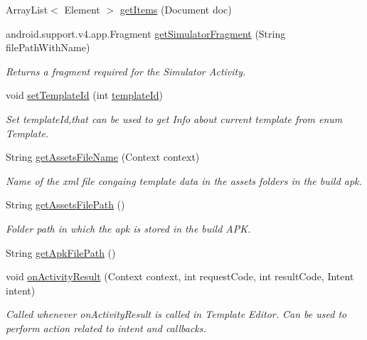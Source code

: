 \begin{DoxyCompactItemize}
Array\+List$<$ Element $>$ \hyperlink{classorg_1_1buildmlearn_1_1toolkit_1_1templates_1_1VideoCollectionTemplate_a1d33eff15dfaa7321a9ccc7d27c42000}{get\+Items} (Document doc)
\item 
android.\+support.\+v4.\+app.\+Fragment \hyperlink{classorg_1_1buildmlearn_1_1toolkit_1_1templates_1_1VideoCollectionTemplate_a5b2d1c99d0ed99bec0b3dc65764d352e}{get\+Simulator\+Fragment} (String file\+Path\+With\+Name)
\begin{DoxyCompactList}\small\item\em Returns a fragment required for the Simulator Activity. \end{DoxyCompactList}\item 
void \hyperlink{classorg_1_1buildmlearn_1_1toolkit_1_1templates_1_1VideoCollectionTemplate_a4ddf0868eaa350d857aad69a07d0b93b}{set\+Template\+Id} (int \hyperlink{classorg_1_1buildmlearn_1_1toolkit_1_1templates_1_1VideoCollectionTemplate_ac6e1ea89fd6a5a50f5a081fca1cf1531}{template\+Id})
\begin{DoxyCompactList}\small\item\em Set template\+Id,that can be used to get Info about current template from enum Template. \end{DoxyCompactList}\item 
String \hyperlink{classorg_1_1buildmlearn_1_1toolkit_1_1templates_1_1VideoCollectionTemplate_a058b86cba7b516627bc0785373d62cd4}{get\+Assets\+File\+Name} (Context context)
\begin{DoxyCompactList}\small\item\em Name of the xml file congaing template data in the assets folders in the build apk. \end{DoxyCompactList}\item 
String \hyperlink{classorg_1_1buildmlearn_1_1toolkit_1_1templates_1_1VideoCollectionTemplate_a74b3646b7e8a1b7db88a0d6598a1b7c6}{get\+Assets\+File\+Path} ()
\begin{DoxyCompactList}\small\item\em Folder path in which the apk is stored in the build A\+PK. \end{DoxyCompactList}\item 
String \hyperlink{classorg_1_1buildmlearn_1_1toolkit_1_1templates_1_1VideoCollectionTemplate_ad04197fe7bad25e5570dd3a060b632bc}{get\+Apk\+File\+Path} ()
\item 
void \hyperlink{classorg_1_1buildmlearn_1_1toolkit_1_1templates_1_1VideoCollectionTemplate_ad780e65b6d5fa9ffb9b0b5e8eb1eda54}{on\+Activity\+Result} (Context context, int request\+Code, int result\+Code, Intent intent)
\begin{DoxyCompactList}\small\item\em Called whenever on\+Activity\+Result is called in Template Editor. Can be used to perform action related to intent and callbacks. \end{DoxyCompactList}\end{DoxyCompactItemize}
